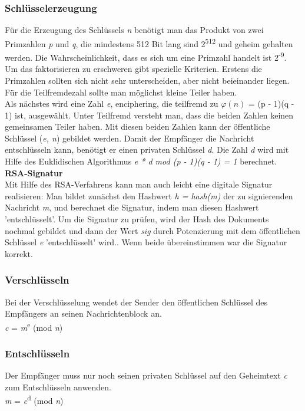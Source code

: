 \documentclass[11pt]{scrartcl}
\begin{document}
\subsubsection{Schlüsselerzeugung}
\label{sec:key-generation}
Für die Erzeugung des Schlüssels \textit{n} benötigt man das Produkt von zwei Primzahlen \textit{p} und \textit{q}, die mindestens 512 Bit lang sind 2\textsuperscript{512} und geheim gehalten werden. Die Wahrscheinlichkeit, dass es sich um eine Primzahl handelt ist 2\textsuperscript{-9}. Um das faktorisieren zu erschweren gibt spezielle Kriterien. Erstens die Primzahlen sollten sich nicht sehr unterscheiden, aber nicht beieinander liegen. Für die Teilfremdezahl sollte man möglichst kleine Teiler haben.\\
Als nächstes wird eine Zahl \textit{e}, enciphering, die teilfremd zu $\varphi(n)$ = (p - 1)(q - 1) ist, ausgewählt. Unter Teilfremd versteht man, dass die beiden Zahlen keinen gemeinsamen Teiler haben. Mit diesen beiden Zahlen kann der öffentliche Schlüssel (\textit{e, n}) gebildet werden. Damit der Empfänger die Nachricht entschlüsseln kann, benötigt er einen privaten Schlüssel \textit{d}. Die Zahl \textit{d} wird mit Hilfe des Euklidischen Algorithmus \textit{e * d mod (p - 1)(q - 1) = 1} berechnet.\\
\textbf{RSA-Signatur}\\
\grqq{}Mit Hilfe des RSA-Verfahrens kann man auch leicht eine digitale Signatur realisieren: Man bildet zunächst den Hashwert \textit{h = hash(m)} der zu signierenden Nachricht \textit{m}, und berechnet die Signatur, indem man diesen Hashwert 'entschlüsselt'.\grqq{}\citep{1}
Um die Signatur zu prüfen, wird der Hash des Dokuments nochmal gebildet und \grqq{} dann der Wert \textit{sig} durch Potenzierung mit dem öffentlichen Schlüssel \textit{e} 'entschlüsselt' wird.\grqq{}\citep{1}.
Wenn beide übereinstimmen war die Signatur korrekt.
\citep{1}\citep{2}\citep{6}
\subsubsection{Verschlüsseln}
\label{sec:rsa-encrypt}
Bei der Verschlüsselung wendet der Sender den öffentlichen Schlüssel des Empfängers an seinen Nachrichtenblock an.\\
\textit{c} = \textit{m}\textsuperscript{e} (mod \textit{n})\\


\subsubsection{Entschlüsseln}
\label{sec:rsa-decrypt}
Der Empfänger muss nur noch seinen privaten Schlüssel auf den Geheimtext \textit{c} zum Entschlüsseln anwenden.\\
\textit{m} = \textit{c}\textsuperscript{d} (mod \textit{n})\\
\end{document}
